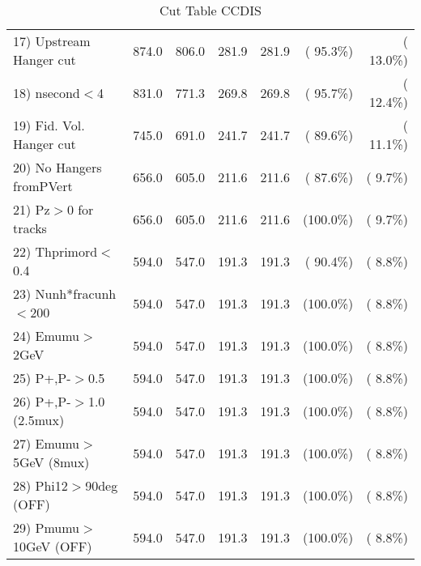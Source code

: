 \begin{table}[h!]
\begin{tabular}{||l||r|r|r|r|r|r||}
 17) Upstream Hanger cut  &        874.0 &        806.0 &        281.9 &        281.9 & ( 95.3\%) & ( 13.0\%) \\
 18) nsecond$<$4          &        831.0 &        771.3 &        269.8 &        269.8 & ( 95.7\%) & ( 12.4\%) \\
 19) Fid. Vol. Hanger cut &        745.0 &        691.0 &        241.7 &        241.7 & ( 89.6\%) & ( 11.1\%) \\
 20) No Hangers fromPVert &        656.0 &        605.0 &        211.6 &        211.6 & ( 87.6\%) & (  9.7\%) \\
 21) Pz$>$0 for tracks    &        656.0 &        605.0 &        211.6 &        211.6 & (100.0\%) & (  9.7\%) \\
 22) Thprimord$<$0.4      &        594.0 &        547.0 &        191.3 &        191.3 & ( 90.4\%) & (  8.8\%) \\
 23) Nunh*fracunh$<$200   &        594.0 &        547.0 &        191.3 &        191.3 & (100.0\%) & (  8.8\%) \\
 24) Emumu$>$2GeV         &        594.0 &        547.0 &        191.3 &        191.3 & (100.0\%) & (  8.8\%) \\
 25) P+,P-$>$0.5          &        594.0 &        547.0 &        191.3 &        191.3 & (100.0\%) & (  8.8\%) \\
 26) P+,P-$>$1.0 (2.5mux) &        594.0 &        547.0 &        191.3 &        191.3 & (100.0\%) & (  8.8\%) \\
 27) Emumu$>$5GeV  (8mux) &        594.0 &        547.0 &        191.3 &        191.3 & (100.0\%) & (  8.8\%) \\
 28) Phi12$>$90deg  (OFF) &        594.0 &        547.0 &        191.3 &        191.3 & (100.0\%) & (  8.8\%) \\
 29) Pmumu$>$10GeV  (OFF) &        594.0 &        547.0 &        191.3 &        191.3 & (100.0\%) & (  8.8\%) \\
 \hline
 \hline
 \end{tabular}
 \caption{Cut Table  CCDIS    }
 \label{tab-cutcohjpsi-mumu_ccdis}
 \end{table}
